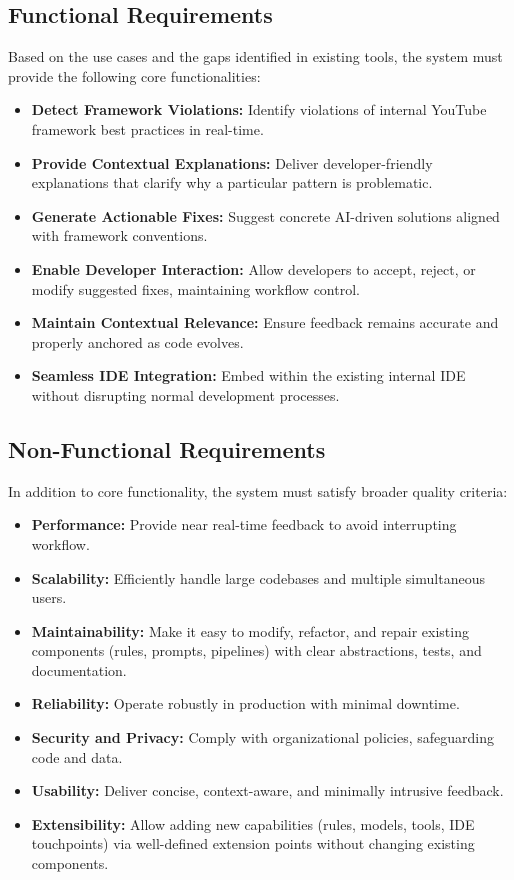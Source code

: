 \begin{spacing}{1.2}
\subsection{Functional Requirements}

Based on the use cases and the gaps identified in existing tools, the system must provide the following core functionalities:

\begin{itemize}
\item \textbf{Detect Framework Violations:} Identify violations of internal YouTube framework best practices in real-time.
\item \textbf{Provide Contextual Explanations:} Deliver developer-friendly explanations that clarify why a particular pattern is problematic.
\item \textbf{Generate Actionable Fixes:} Suggest concrete AI-driven solutions aligned with framework conventions.
\item \textbf{Enable Developer Interaction:} Allow developers to accept, reject, or modify suggested fixes, maintaining workflow control.
\item \textbf{Maintain Contextual Relevance:} Ensure feedback remains accurate and properly anchored as code evolves.
\item \textbf{Seamless IDE Integration:} Embed within the existing internal IDE without disrupting normal development processes.
\end{itemize}

\subsection{Non-Functional Requirements}

In addition to core functionality, the system must satisfy broader quality criteria:

\begin{itemize}
\item \textbf{Performance:} Provide near real-time feedback to avoid interrupting workflow.
\item \textbf{Scalability:} Efficiently handle large codebases and multiple simultaneous users.
\item \textbf{Maintainability:} Make it easy to modify, refactor, and repair existing components (rules, prompts, pipelines) with clear abstractions, tests, and documentation.
\item \textbf{Reliability:} Operate robustly in production with minimal downtime.
\item \textbf{Security and Privacy:} Comply with organizational policies, safeguarding code and data.
\item \textbf{Usability:} Deliver concise, context-aware, and minimally intrusive feedback.
\item \textbf{Extensibility:} Allow adding new capabilities (rules, models, tools, IDE touchpoints) via well-defined extension points without changing existing components.
\end{itemize}


\end{spacing}
